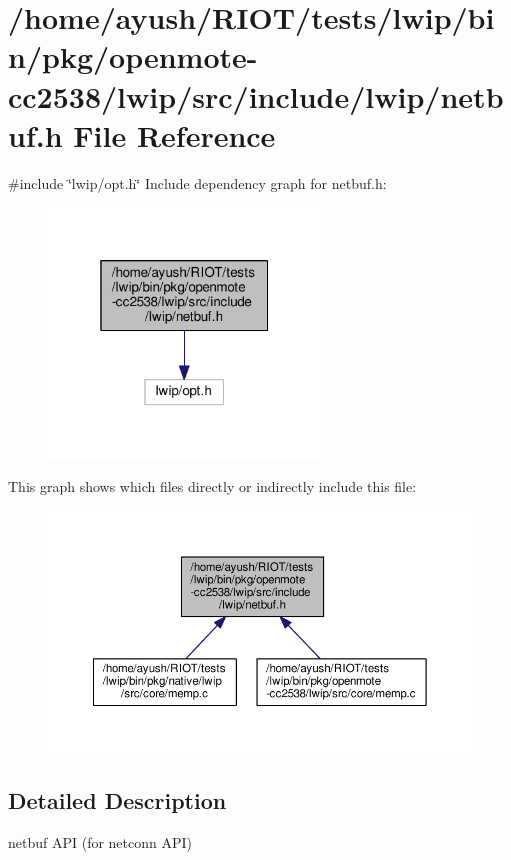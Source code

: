 \hypertarget{openmote-cc2538_2lwip_2src_2include_2lwip_2netbuf_8h}{}\section{/home/ayush/\+R\+I\+O\+T/tests/lwip/bin/pkg/openmote-\/cc2538/lwip/src/include/lwip/netbuf.h File Reference}
\label{openmote-cc2538_2lwip_2src_2include_2lwip_2netbuf_8h}
{\ttfamily \#include \char`\"{}lwip/opt.\+h\char`\"{}}\newline
Include dependency graph for netbuf.\+h\+:
\nopagebreak
\begin{figure}[H]
\begin{center}
\leavevmode
\includegraphics[width=205pt]{openmote-cc2538_2lwip_2src_2include_2lwip_2netbuf_8h__incl}
\end{center}
\end{figure}
This graph shows which files directly or indirectly include this file\+:
\nopagebreak
\begin{figure}[H]
\begin{center}
\leavevmode
\includegraphics[width=350pt]{openmote-cc2538_2lwip_2src_2include_2lwip_2netbuf_8h__dep__incl}
\end{center}
\end{figure}


\subsection{Detailed Description}
netbuf A\+PI (for netconn A\+PI) 